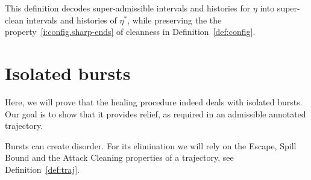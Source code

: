 \documentclass[11pt]{memoir}
\newcommand{\authnote}[3]
{\text{{ \textcolor{#3}{\( \langle\hspace{-0.2em}\langle \)\textsf{\footnotesize #1: #2}\( \rangle\hspace{-0.2em}\rangle \)}}}}
\newcommand{\authnote}[2]{}
\newcommand{\Pnote}[1]{{\authnote{P}{#1}{cyan}}}
\theoremstyle{definition} %
\newtheorem{Premark}{\color{cyan}Peter remark}
\newenvironment{premark}{\begin{Premark}\color{cyan}}{\varqed\end{Premark}}
\renewcommand{\Pnote}[1]{\begin{premark}#1\end{premark}}
\renewcommand{\ge}{\geq}
\def\B{B}
\newcommand{\Q}{Q}
\newcommand{\Tu}{T}
\begin{document}
This definition decodes super-admissible intervals and histories for \( \eta \) into super-clean intervals and histories
of \( \eta^{*} \), while preserving the the property~\eqref{i:config.sharp-ends} of cleanness in Definition~\ref{def:config}.





\section{Isolated bursts}\label{sec:1-level-noise}

Here, we will prove that the healing procedure indeed deals with isolated bursts.
Our goal is to show that it provides relief, as required in an
admissible annotated trajectory.

Bursts can create disorder.
For its elimination we will rely on the Escape, Spill Bound and the Attack Cleaning
properties of a trajectory, see Definition~\ref{def:traj}.
\end{document}
